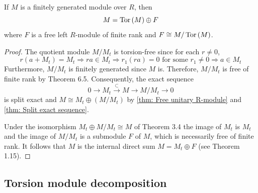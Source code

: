 \begin{theorem}
    If $M$ is a finitely generated module over $R$, then
    \begin{equation*}
        M=\operatorname{\operatorname{Tor}}\left(M\right) \oplus F
    \end{equation*}
    where $F$ is a free left $R$-module of finite rank and $F \cong M / \operatorname{\operatorname{Tor}}\left(M\right)$.
    \begin{proof}
        The quotient module $M / M_t$ is torsion-free since for each $r \neq 0$,
        \begin{equation*}
            r\left(a+M_t\right)=M_t \Rightarrow r a \in M_t \Rightarrow r_1(r a)=0 \text { for some } r_1 \neq 0 \Rightarrow a \in M_t
        \end{equation*}
        Furthermore, $M / M_t$ is finitely generated since $M$ is. Therefore, $M / M_t$ is free of finite rank by Theorem 6.5.
        Consequently, the exact sequence
        \begin{equation*}
            0 \rightarrow M_t \xrightarrow{\subset} M \rightarrow M / M_t \rightarrow 0
        \end{equation*}
        is split exact and $M \cong M_t \oplus \left(M / M_t\right)$ by \ref{thm: Free unitary R-module} and \ref{thm: Split exact sequence}.

        Under the isomorphism $M_t \oplus M / M_t \cong M$ of Theorem 3.4 the image of $M_t$ is $M_t$ and the image of $M / M_t$ is a submodule $F$ of $M$, which is necessarily free of finite rank. It follows that $M$ is the internal direct sum $M=M_t \oplus F$ (see Theorem 1.15).
    \end{proof}
\end{theorem}

\subsection{Torsion module decomposition}

